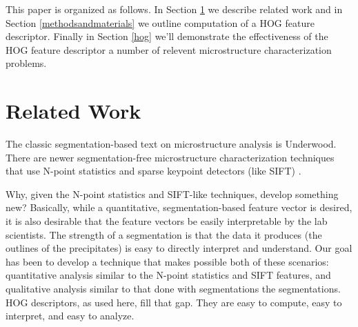 \documentclass[review]{elsarticle}
\begin{document}
		This paper is organized as follows. In Section \ref{relatedwork} we describe related work and in Section \ref{methodsandmaterials} we outline computation of a HOG feature descriptor. Finally in Section \ref{hog} we'll demonstrate the effectiveness of the HOG feature descriptor a number of relevent microstructure characterization problems.
	
	\section{Related Work}\label{relatedwork}
		The classic segmentation-based text on microstructure analysis is Underwood\cite{underwood}. There are newer segmentation-free microstructure characterization techniques that use N-point statistics \cite{kalidindi1, kalidindi2} and sparse keypoint detectors (like SIFT) \cite{decost}.

		Why, given the N-point statistics and SIFT-like techniques, develop something new? Basically, while a quantitative, segmentation-based feature vector is desired, it is also desirable that the feature vectors be easily interpretable by the lab scientists. The strength of a segmentation is that the data it produces (the outlines of the precipitates) is easy to directly interpret and understand. Our goal has been to develop a technique that makes possible both of these scenarios: quantitative analysis similar to the N-point statistics and SIFT features, and qualitative analysis similar to that done with segmentations the segmentations. HOG descriptors, as used here, fill that gap. They are easy to compute, easy to interpret, and easy to analyze.
	
	
	
	
\end{document}

